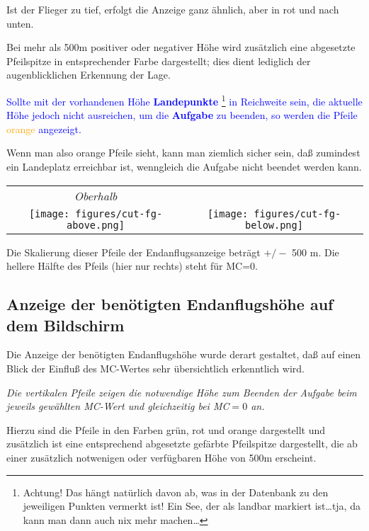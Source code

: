 Ist der Flieger zu tief, erfolgt die Anzeige ganz ähnlich, aber in rot und nach unten.

Bei mehr als 500m positiver oder negativer Höhe wird zusätzlich eine abgesetzte Pfeilspitze in entsprechender
Farbe dargestellt; dies dient lediglich der augenblicklichen Erkennung der Lage.

\textcolor{blue}{Sollte mit der vorhandenen Höhe \textbf{Landepunkte} \footnote{Achtung!  Das hängt natürlich  davon ab, was in der Datenbank zu den jeweiligen Punkten vermerkt ist!  Ein See, der als landbar markiert ist\dots  tja, da kann man dann auch nix mehr  machen\dots} in Reichweite sein, \achtung die aktuelle Höhe jedoch nicht ausreichen, um die \textbf{ Aufgabe} zu beenden, so werden die Pfeile \textcolor{orange}{orange} angezeigt.}

Wenn man also orange Pfeile sieht, kann man ziemlich sicher sein, daß zumindest ein Landeplatz erreichbar ist, wenngleich die Aufgabe nicht beendet werden kann. 

\begin{center}
\begin{tabular}{c c}
{\it Oberhalb}\phantom{ABC} & \phantom{ABC}{\it Unterhalb} \quad  \\
\texttt{[image: figures/cut-fg-above.png]} &
\texttt{[image: figures/cut-fg-below.png]}
\end{tabular}
\end{center}
Die Skalierung dieser Pfeile der Endanflugsanzeige beträgt $+/-$ 500 m.  
Die hellere Hälfte des Pfeils (hier nur rechts) steht für MC=0.


\subsection*{Anzeige der benötigten Endanflugshöhe auf dem Bildschirm}

Die Anzeige der benötigten Endanflugshöhe wurde derart gestaltet, daß auf einen Blick der
Einfluß des MC-Wertes sehr übersichtlich erkenntlich wird.

\emph{Die vertikalen Pfeile zeigen die notwendige Höhe zum Beenden der Aufgabe
beim jeweils gewählten MC-Wert und gleichzeitig  bei MC$=0$ an.}

Hierzu sind die Pfeile in den Farben grün, rot und orange dargestellt und zusätzlich ist eine entsprechend
abgesetzte gefärbte Pfeilspitze dargestellt, die ab einer zusätzlich notwenigen oder verfügbaren Höhe
von 500m erscheint.

